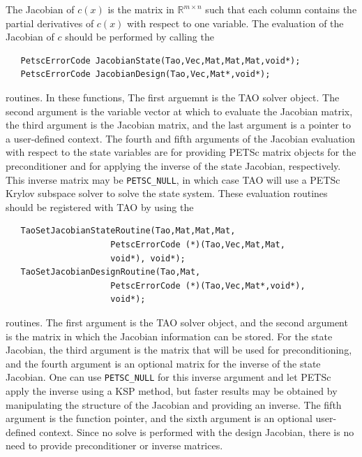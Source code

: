 \documentclass[]{book}
\newcommand{\R}{\mathbb R}
\renewcommand{\Re}{\R}
\begin{document}
The Jacobian of $c(x)$ is the matrix in $\Re^{m \times n}$ such that each 
column contains the partial derivatives of $c(x)$ with respect to one 
variable.  The evaluation of the Jacobian of $c$ should be performed 
by calling the 
\begin{verbatim}
   PetscErrorCode JacobianState(Tao,Vec,Mat,Mat,Mat,void*);
   PetscErrorCode JacobianDesign(Tao,Vec,Mat*,void*);
\end{verbatim}
routines. 
In these functions, The first arguemnt is the TAO solver object.  The second 
argument is the variable vector at which to 
evaluate the Jacobian matrix, the third argument is the Jacobian matrix,
and the last argument is a pointer to a user-defined context. The fourth
and
fifth arguments of the Jacobian evaluation with respect to the state
variables
are for providing PETSc matrix objects for the preconditioner and for
applying
the inverse of the state Jacobian, respectively.  This inverse matrix may be 
{\tt PETSC\_NULL}, in which case TAO will use a PETSc Krylov subspace 
solver to solve the state system.  These evaluation routines should be 
registered 
with TAO by using the 
\begin{verbatim}
   TaoSetJacobianStateRoutine(Tao,Mat,Mat,Mat,
                     PetscErrorCode (*)(Tao,Vec,Mat,Mat,
                     void*), void*);
   TaoSetJacobianDesignRoutine(Tao,Mat,
                     PetscErrorCode (*)(Tao,Vec,Mat*,void*), 
                     void*);
\end{verbatim}
routines. 
The first argument is the TAO solver object, and the second argument is the
matrix 
in which the Jacobian information can be stored.  For the state Jacobian,
the 
third argument is the matrix that will be used for preconditioning, and the 
fourth argument is an optional matrix for the inverse of the state
Jacobian.
One can use {\tt PETSC\_NULL} for this inverse argument and let PETSc
apply 
the inverse using a KSP method, but faster results may be obtained by
manipulating the structure of the Jacobian and providing an inverse.
The fifth argument is the function pointer, and the sixth argument is
an optional user-defined context.  Since no solve is performed with the
design Jacobian, there is no need to provide preconditioner or inverse
matrices.
\end{document}
